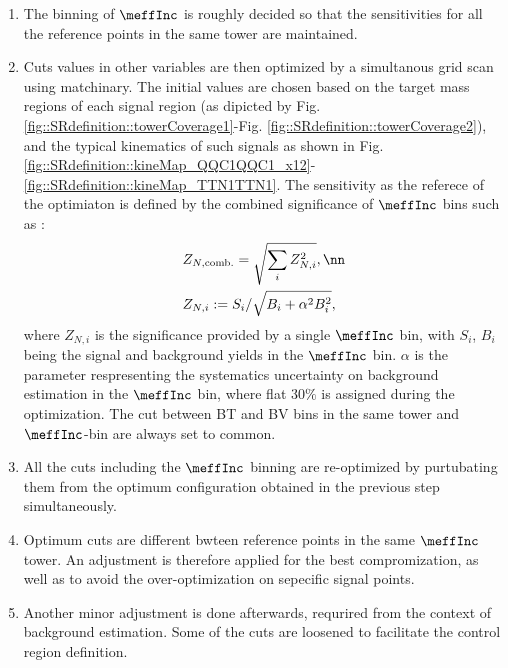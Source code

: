 \begin{enumerate}
\item The binning of $\meffInc$ is roughly decided so that the sensitivities for all the reference points in the same tower are maintained.
\item Cuts values in other variables are then optimized by a simultanous grid scan using matchinary. The initial values are chosen based on the target mass regions of each signal region (as dipicted by Fig. \ref{fig::SRdefinition::towerCoverage1}-Fig. \ref{fig::SRdefinition::towerCoverage2}), and the typical kinematics of such signals as shown in Fig. \ref{fig::SRdefinition::kineMap_QQC1QQC1_x12}-\ref{fig::SRdefinition::kineMap_TTN1TTN1}.
The sensitivity as the referece of the optimiaton is defined by the combined significance of $\meffInc$ bins such as :
\begin{align}
& Z_{N,\mathrm{comb.}} =\sqrt{\sum_i Z_{N,i}^2}, \nn \\
& Z_{N,i} := S_i/\sqrt{B_i+\alpha^2 B_i^2}, \label{ZNcomb}
\end{align}
where $Z_{N,i}$ is the significance provided by a single $\meffInc$ bin, with $S_i$, $B_i$ being the signal and background yields in the $\meffInc$ bin. $\alpha$ is the parameter respresenting the systematics uncertainty on background estimation in the $\meffInc$ bin, where flat $30\%$ is assigned during the optimization. The cut between BT and BV bins in the same tower and $\meffInc$-bin are always set to common.

\item All the cuts including the $\meffInc$ binning are re-optimized by purtubating them from the optimum configuration obtained in the previous step simultaneously.

\item Optimum cuts are different bwteen reference points in the same $\meffInc$ tower. An adjustment is therefore applied for the best compromization, as well as to avoid the over-optimization on sepecific signal points.

\item Another minor adjustment is done afterwards, requrired from the context of background estimation. Some of the cuts are loosened to facilitate the control region definition.
\end{enumerate}

